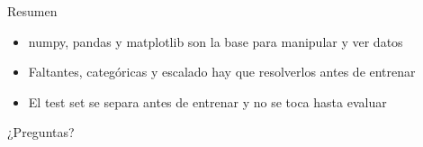 \begin{frame}{Resumen}
  \begin{itemize}
    \item numpy, pandas y matplotlib son la base para manipular y ver datos
    \item Faltantes, categóricas y escalado hay que resolverlos antes de entrenar
    \item El test set se separa antes de entrenar y no se toca hasta evaluar
  \end{itemize}
  \vspace{1em}
  \centering
  \Large ¿Preguntas?
\end{frame}


